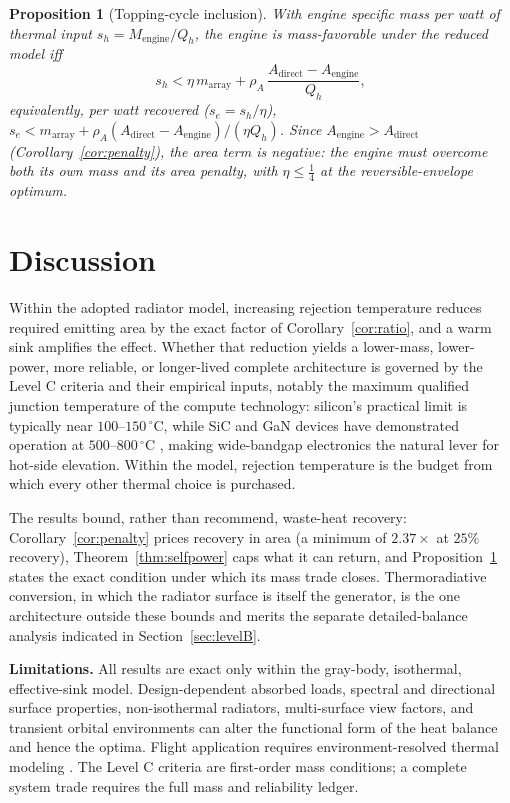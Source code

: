 \documentclass[11pt]{article}
\newtheorem{proposition}{Proposition}
\theoremstyle{definition}
\theoremstyle{remark}
\begin{document}
\begin{proposition}[Topping-cycle inclusion]\label{prop:p3}
With engine specific mass per watt of thermal input $s_{h}=M_{\mathrm{engine}}/Q_{h}$, the engine is mass-favorable under the reduced model iff
\begin{equation}
s_{h}<\eta\,m_{\mathrm{array}}
+\rho_{A}\,\frac{A_{\mathrm{direct}}-A_{\mathrm{engine}}}{Q_{h}},
\end{equation}
equivalently, per watt recovered ($s_{e}=s_{h}/\eta$), $s_{e}<m_{\mathrm{array}}+\rho_{A}(A_{\mathrm{direct}}-A_{\mathrm{engine}})/(\eta Q_{h})$. Since $A_{\mathrm{engine}}>A_{\mathrm{direct}}$ (Corollary~\ref{cor:penalty}), the area term is negative: the engine must overcome both its own mass and its area penalty, with $\eta\le\tfrac14$ at the reversible-envelope optimum.
\end{proposition}

\section{Discussion}\label{sec:discussion}

Within the adopted radiator model, increasing rejection temperature reduces required emitting area by the exact factor of Corollary~\ref{cor:ratio}, and a warm sink amplifies the effect. Whether that reduction yields a lower-mass, lower-power, more reliable, or longer-lived complete architecture is governed by the Level C criteria and their empirical inputs, notably the maximum qualified junction temperature of the compute technology: silicon's practical limit is typically near $100$--$150\,^{\circ}$C, while SiC and GaN devices have demonstrated operation at $500$--$800\,^{\circ}$C \cite{gesic,uiucgan}, making wide-bandgap electronics the natural lever for hot-side elevation. Within the model, rejection temperature is the budget from which every other thermal choice is purchased.

The results bound, rather than recommend, waste-heat recovery: Corollary~\ref{cor:penalty} prices recovery in area (a minimum of $2.37\times$ at $25\%$ recovery), Theorem~\ref{thm:selfpower} caps what it can return, and Proposition~\ref{prop:p3} states the exact condition under which its mass trade closes. Thermoradiative conversion, in which the radiator surface is itself the generator, is the one architecture outside these bounds and merits the separate detailed-balance analysis indicated in Section~\ref{sec:levelB}.

\textbf{Limitations.} All results are exact only within the gray-body, isothermal, effective-sink model. Design-dependent absorbed loads, spectral and directional surface properties, non-isothermal radiators, multi-surface view factors, and transient orbital environments can alter the functional form of the heat balance and hence the optima. Flight application requires environment-resolved thermal modeling \cite{nasaguidebook}. The Level C criteria are first-order mass conditions; a complete system trade requires the full mass and reliability ledger.
\end{document}
